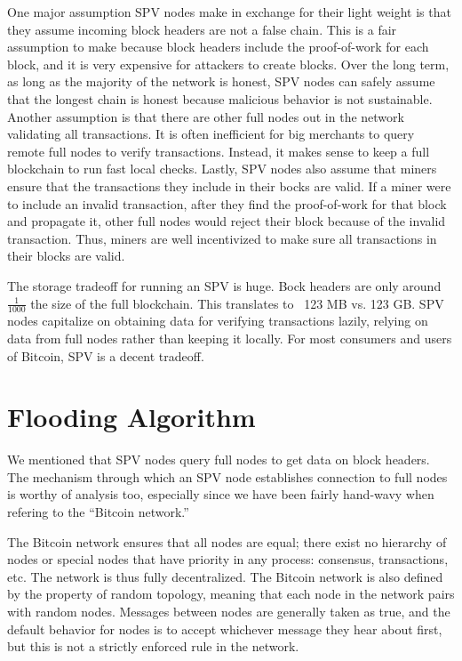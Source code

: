 \documentclass[full.tex]{subfiles}
\begin{document}
 One major assumption SPV nodes make in exchange for their light weight is that they assume incoming block headers are not a false chain. This is a fair assumption to make because block headers include the proof-of-work for each block, and it is very expensive for attackers to create blocks. Over the long term, as long as the majority of the network is honest, SPV nodes can safely assume that the longest chain is honest because malicious behavior is not sustainable. Another assumption is that there are other full nodes out in the network validating all transactions. It is often inefficient for big merchants to query remote full nodes to verify transactions. Instead, it makes sense to keep a full blockchain to run fast local checks. Lastly, SPV nodes also assume that miners ensure that the transactions they include in their bocks are valid. If a miner were to include an invalid transaction, after they find the proof-of-work for that block and propagate it, other full nodes would reject their block because of the invalid transaction. Thus, miners are well incentivized to make sure all transactions in their blocks are valid.
 
 The storage tradeoff for running an SPV is huge. Bock headers are only around $\frac{1}{1000}$ the size of the full blockchain. This translates to ~123 MB vs. 123 GB. SPV nodes capitalize on obtaining data for verifying transactions lazily, relying on data from full nodes rather than keeping it locally. For most consumers and users of Bitcoin, SPV is a decent tradeoff.
 
 \section*{Flooding Algorithm}
 
 We mentioned that SPV nodes query full nodes to get data on block headers. The mechanism through which an SPV node establishes connection to full nodes is worthy of analysis too, especially since we have been fairly hand-wavy when refering to the ``Bitcoin network.''
 
 The Bitcoin network ensures that all nodes are equal; there exist no hierarchy of nodes or special nodes that have priority in any process: consensus, transactions, etc. The network is thus fully decentralized. The Bitcoin network is also defined by the property of random topology, meaning that each node in the network pairs with random nodes. Messages between nodes are generally taken as true, and the default behavior for nodes is to accept whichever message they hear about first, but this is not a strictly enforced rule in the network.
 
\end{document}
